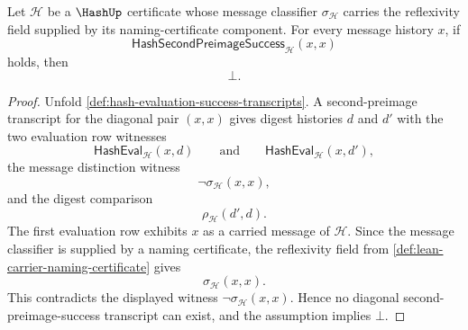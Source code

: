 \begin{theorem}
\label{thm:hash-second-preimage-success-irreflexive-on-message}
Let $\mathcal H$ be a $\HashUp$ certificate whose message classifier $\sigma_{\mathcal H}$ carries the reflexivity field supplied by its naming-certificate component. For every message history $x$, if
$$
\mathsf{HashSecondPreimageSuccess}_{\mathcal H}(x,x)
$$
holds, then
$$
\bot.
$$
\end{theorem}
\begin{proof}
Unfold \autoref{def:hash-evaluation-success-transcripts}. A second-preimage transcript for the diagonal pair $(x,x)$ gives digest histories $d$ and $d'$ with the two evaluation row witnesses
$$
\mathsf{HashEval}_{\mathcal H}(x,d)
\qquad\text{and}\qquad
\mathsf{HashEval}_{\mathcal H}(x,d'),
$$
the message distinction witness
$$
\neg\sigma_{\mathcal H}(x,x),
$$
and the digest comparison
$$
\rho_{\mathcal H}(d',d).
$$
The first evaluation row exhibits $x$ as a carried message of $\mathcal H$. Since the message classifier is supplied by a naming certificate, the reflexivity field from \autoref{def:lean-carrier-naming-certificate} gives
$$
\sigma_{\mathcal H}(x,x).
$$
This contradicts the displayed witness $\neg\sigma_{\mathcal H}(x,x)$. Hence no diagonal second-preimage-success transcript can exist, and the assumption implies $\bot$.
\end{proof}
